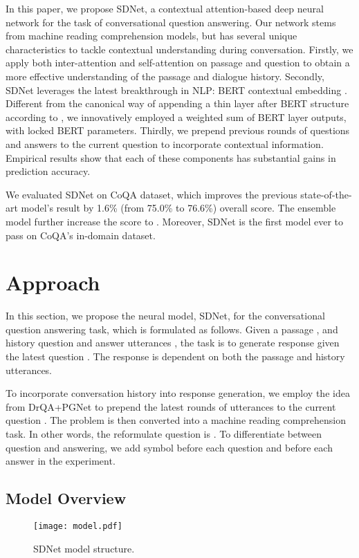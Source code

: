 \documentclass{article} \usepackage{sdnet,times}
\begin{document}
In this paper, we propose SDNet, a contextual attention-based deep neural network for the task of conversational question answering. Our network stems from machine reading comprehension models, but has several unique characteristics to tackle contextual understanding during conversation. Firstly, we apply both inter-attention and self-attention on passage and question to obtain a more effective understanding of the passage and dialogue history.
Secondly, SDNet leverages the latest breakthrough in NLP: BERT contextual embedding \citep{bert}. Different from the canonical way of appending a thin layer after BERT structure according to \citep{bert}, we innovatively employed a weighted sum of BERT layer outputs, with locked BERT parameters. Thirdly, we prepend previous rounds of questions and answers to the current question to incorporate contextual information. Empirical results show that each of these components has substantial gains in prediction accuracy.

We evaluated SDNet on CoQA dataset, which improves the previous state-of-the-art model's result by 1.6\% (from 75.0\% to 76.6\%) overall  score. The ensemble model further increase the  score to . Moreover, SDNet is the first model ever to pass  on CoQA's in-domain dataset. 

\section{Approach}
In this section, we propose the neural model, SDNet, for the conversational question answering task, which is formulated as follows. Given a passage , and history question and answer utterances , the task is to generate response  given the latest question . The response is dependent on both the passage and history utterances.

To incorporate conversation history into response generation, we employ the idea from DrQA+PGNet \citep{coqa} to prepend the latest  rounds of utterances to the current question  . The problem is then converted into a machine reading comprehension task. In other words, the reformulate question is . To differentiate between question and answering, we add symbol  before each question and  before each answer in the experiment.

\subsection{Model Overview}

\begin{figure*}[t]
\hspace*{-1.25cm}
\texttt{[image: model.pdf]}
\vspace{-5\baselineskip}
\caption{SDNet model structure.}
\label{fig:model}
\end{figure*}
\end{document}
